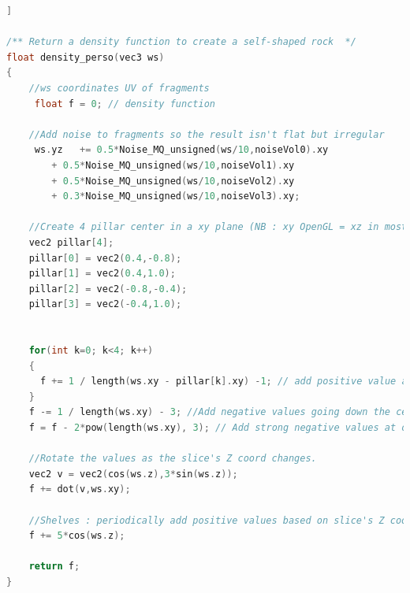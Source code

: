 \documentclass[a4paper]{article}
\begin{document}
\begin{lstlisting}[language=C++,
                   directivestyle={\color{black}}
                   emph={int,char,double,float,unsigned},
                   emphstyle={\color{blue}}]]
                   
/** Return a density function to create a self-shaped rock  */
float density_perso(vec3 ws)
{
    //ws coordinates UV of fragments
     float f = 0; // density function
     
    //Add noise to fragments so the result isn't flat but irregular
     ws.yz   += 0.5*Noise_MQ_unsigned(ws/10,noiseVol0).xy 
	    + 0.5*Noise_MQ_unsigned(ws/10,noiseVol1).xy
	    + 0.5*Noise_MQ_unsigned(ws/10,noiseVol2).xy
	    + 0.3*Noise_MQ_unsigned(ws/10,noiseVol3).xy;
    
    //Create 4 pillar center in a xy plane (NB : xy OpenGL = xz in most of the case)
    vec2 pillar[4];
    pillar[0] = vec2(0.4,-0.8);
    pillar[1] = vec2(0.4,1.0);
    pillar[2] = vec2(-0.8,-0.4);
    pillar[3] = vec2(-0.4,1.0);

    
    for(int k=0; k<4; k++)
    {
      f += 1 / length(ws.xy - pillar[k].xy) -1; // add positive value at pillar
    }
    f -= 1 / length(ws.xy) - 3; //Add negative values going down the center (water flow channel)
    f = f - 2*pow(length(ws.xy), 3); // Add strong negative values at outer edge (Help to keep solid rock in bounds)
    
    //Rotate the values as the slice's Z coord changes. 
    vec2 v = vec2(cos(ws.z),3*sin(ws.z));
    f += dot(v,ws.xy);
    
    //Shelves : periodically add positive values based on slice's Z coord. 
    f += 5*cos(ws.z);
    
    return f;
}
\end{lstlisting}
\end{document}
